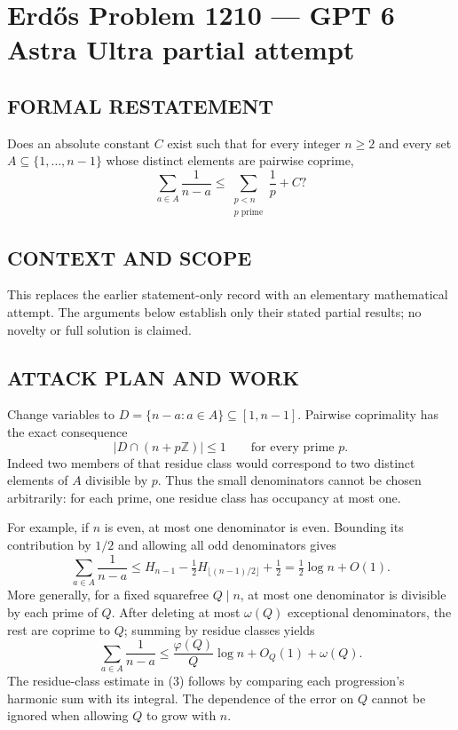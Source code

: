 \section*{Erd\H{o}s Problem 1210 --- GPT 6 Astra Ultra partial attempt}


\subsection*{FORMAL RESTATEMENT}
Does an absolute constant $C$ exist such that for every integer $n\geq2$ and every set $A\subseteq\{1,\ldots,n-1\}$ whose distinct elements are pairwise coprime,
\[\sum_{a\in A}\frac1{n-a}\leq\sum_{\substack{p<n\\p\text{ prime}}}\frac1p+C?\]

\subsection*{CONTEXT AND SCOPE}
This replaces the earlier statement-only record with an elementary mathematical attempt. The arguments below establish only their stated partial results; no novelty or full solution is claimed.

\subsection*{ATTACK PLAN AND WORK}
Change variables to $D=\{n-a:a\in A\}\subseteq[1,n-1]$. Pairwise coprimality
has the exact consequence
\[|D\cap(n+p\mathbb Z)|\le1\qquad\text{for every prime }p.\tag{1}\]
Indeed two members of that residue class would correspond to two distinct
elements of $A$ divisible by $p$. Thus the small denominators cannot be chosen
arbitrarily: for each prime, one residue class has occupancy at most one.

For example, if $n$ is even, at most one denominator is even. Bounding its
contribution by $1/2$ and allowing all odd denominators gives
\[\sum_{a\in A}\frac1{n-a}
\le H_{n-1}-\tfrac12H_{\lfloor(n-1)/2\rfloor}+\tfrac12
=\tfrac12\log n+O(1).\tag{2}\]
More generally, for a fixed squarefree $Q\mid n$, at most one denominator is
divisible by each prime of $Q$. After deleting at most $\omega(Q)$ exceptional
denominators, the rest are coprime to $Q$; summing by residue classes yields
\[\sum_{a\in A}\frac1{n-a}
\le\frac{\varphi(Q)}Q\log n+O_Q(1)+\omega(Q).\tag{3}\]
The residue-class estimate in (3) follows by comparing each progression's
harmonic sum with its integral. The dependence of the error on $Q$ cannot
be ignored when allowing $Q$ to grow with $n$.

